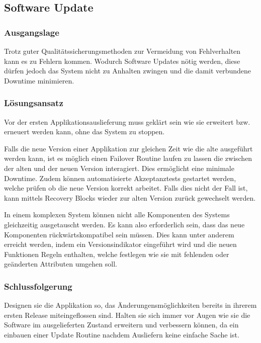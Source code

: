 
\subsection{Software Update}

\subsubsection*{Ausgangslage}

Trotz guter Qualitätssicherungsmethoden zur Vermeidung von Fehlverhalten kann es zu Fehlern kommen. Wodurch Software Updates nötig werden, diese dürfen jedoch das System nicht zu Anhalten zwingen und die damit verbundene Downtime minimieren.

\subsubsection*{Lösungsansatz}

Vor der ersten Applikationsauslieferung muss geklärt sein wie sie erweitert bzw. erneuert werden kann, ohne das System zu stoppen.

Falls die neue Version einer Applikation zur gleichen Zeit wie die alte ausgeführt werden kann, ist es möglich einen Failover Routine laufen zu lassen die zwischen der alten und der neuen Version interagiert. Dies ermöglicht eine minimale Downtime. Zudem können automatisierte Akzeptanztests gestartet werden, welche prüfen ob die neue Version korrekt arbeitet. Falls dies nicht der Fall ist, kann mittels Recovery Blocks wieder zur alten Version zurück gewechselt werden.

In einem komplexen System können nicht alle Komponenten des Systems gleichzeitig ausgetauscht werden. Es kann also erforderlich sein, dass das neue Komponenten rückwärtskompatibel sein müssen. Dies kann unter anderem erreicht werden, indem ein Versionsindikator eingeführt wird und die neuen Funktionen Regeln enthalten, welche festlegen wie sie mit fehlenden oder geänderten Attributen umgehen soll.

\subsubsection*{Schlussfolgerung}

Designen sie die Applikation so, das Änderungensmöglichkeiten bereits in ihrerem ersten Release miteingeflossen sind. Halten sie sich immer vor Augen wie sie die Software im ausgelieferten Zustand erweitern und verbessern können, da ein einbauen einer Update Routine nachdem Ausliefern keine einfache Sache ist.

